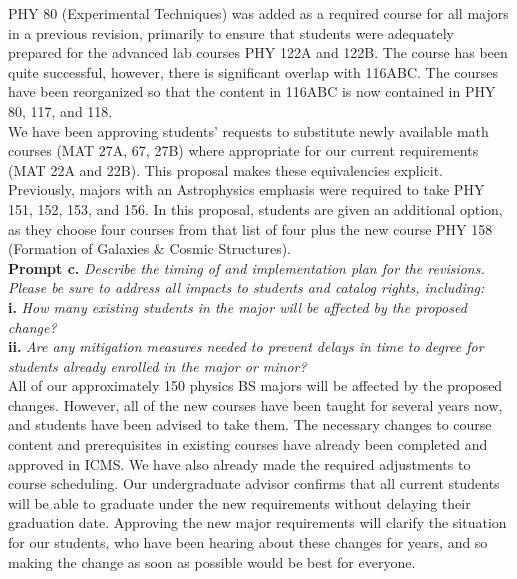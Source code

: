 \documentclass[12pt]{article}
\begin{document}
\noindent
PHY 80 (Experimental Techniques) was added as a required course for all
majors in a previous revision, primarily to ensure that students were
adequately prepared for the advanced lab courses PHY 122A and 122B.
The course has been quite successful, however, there is significant
overlap with 116ABC.  The courses have been reorganized so that the
content in 116ABC is now contained in PHY 80, 117, and 118.\\

\noindent
We have been approving students' requests to substitute newly available
math courses (MAT 27A, 67, 27B) where appropriate for our current
requirements (MAT 22A and 22B).  This proposal makes these
equivalencies explicit.\\

\noindent
Previously, majors with an Astrophysics emphasis were required to take
PHY 151, 152, 153, and 156.  In this proposal, students are given an
additional option, as they choose four courses from that list of four
plus the new course PHY 158 (Formation of Galaxies \& Cosmic Structures).\\

\noindent
{\bf Prompt c.} {\it Describe the timing of and implementation plan for the revisions. Please be sure to address all impacts to students and catalog rights, including:}\\
{\bf i.} {\it How many existing students in the major will be affected by the proposed change?}\\
{\bf ii.} {\it Are any mitigation measures needed to prevent delays in time to degree for students already enrolled in the major or minor?}\\

\noindent
All of our approximately 150 physics BS majors will be affected by the
proposed changes.  However, all of the new courses have been taught
for several years now, and students have been advised to take them.
The necessary changes to course content and prerequisites in existing
courses have already been completed and approved in ICMS.  We have also
already made the required adjustments to course scheduling.  Our
undergraduate advisor confirms that all current students will be able
to graduate under the new requirements without delaying their
graduation date.  Approving the new major requirements will clarify
the situation for our students, who have been hearing about these
changes for years, and so making the change as soon as possible would
be best for everyone.\\[5pt]
\end{document}
